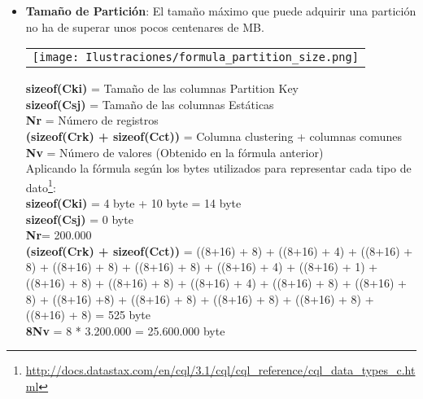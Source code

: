 \begin{itemize}
\begin{table}[h!]
\begin{tabular}{|l|}
			\\
			\hline
			
		\end{tabular}
	\end{table}
	
	\item \textbf{Tamaño de Partición}: El tamaño máximo que puede adquirir una partición no ha de superar unos pocos centenares de MB.
	
	\begin{table}[h!]
		\centering
		\begin{tabular}{l}
			
			\\
			
			\texttt{[image: Ilustraciones/formula\_partition\_size.png]}
			
			\\
			
		\end{tabular}
	\end{table}
	
	\textbf{sizeof(Cki)} = Tamaño de las columnas Partition Key\\
	\textbf{sizeof(Csj)} = Tamaño de las columnas Estáticas\\
	\textbf{Nr} = Número de registros\\
	\textbf{(sizeof(Crk) + sizeof(Cct))} = Columna clustering + columnas comunes\\
	\textbf{Nv} = Número de valores (Obtenido en la fórmula anterior)\\
	
	Aplicando la fórmula según los bytes utilizados para representar cada tipo de dato\footnote{\url{http://docs.datastax.com/en/cql/3.1/cql/cql_reference/cql_data_types_c.html}}:\\
	
	\textbf{sizeof(Cki)} = 4 byte + 10 byte = 14 byte\\
	\textbf{sizeof(Csj)} = 0 byte\\
	\textbf{Nr}= 200.000\\
	\textbf{(sizeof(Crk) + sizeof(Cct))} =  ((8+16) + 8) + ((8+16) + 4) + ((8+16) + 8) + ((8+16) + 8) + 
	((8+16) + 8) + ((8+16) + 4) + ((8+16) + 1) + ((8+16) + 8) + ((8+16) + 8) + ((8+16) + 4) + 
	((8+16) + 8) + ((8+16) + 8) + ((8+16) +8) + ((8+16) + 8) + ((8+16) + 8) + ((8+16) + 8) + 
	((8+16) + 8) = 525 byte\\
	\textbf{8Nv} = 8 * 3.200.000 = 25.600.000 byte\\
	

\end{itemize}

